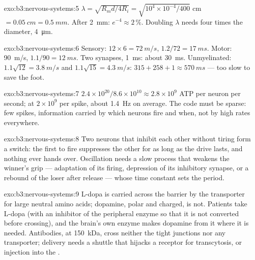 \begin{solution}{exo:b3:nervous-systems:5}
$\lambda = \sqrt{R_{m}d/4R_{i}} = \sqrt{10^{4}\times 10^{-4}/400}$ cm
$= \qty{0.05}{cm} = \qty{0.5}{mm}$. After \qty{2}{mm}: $e^{-4} \approx
2\,\%$. Doubling $\lambda$ needs four times the diameter,
\qty{4}{\micro m}.
\end{solution}

\begin{solution}{exo:b3:nervous-systems:6}
Sensory: $12\times 6 = \qty{72}{m/s}$, $1.2/72 = \qty{17}{ms}$. Motor:
\qty{90}{m/s}, $1.1/90 = \qty{12}{ms}$. Two synapses, \qty{1}{ms}: about
\qty{30}{ms}. Unmyelinated: $1.1\sqrt{12} = \qty{3.8}{m/s}$ and
$1.1\sqrt{15} = \qty{4.3}{m/s}$: $315 + 258 + 1 \approx \qty{570}{ms}$
--- too slow to save the foot.
\end{solution}

\begin{solution}{exo:b3:nervous-systems:7}
$2.4\times 10^{20}/8.6\times 10^{10} \approx 2.8\times 10^{9}$ ATP per
neuron per second; at $2\times 10^{9}$ per spike, about \qty{1.4}{Hz}
on average. The code must be sparse: few spikes, information carried by
which neurons fire and when, not by high rates everywhere.
\end{solution}

\begin{solution}{exo:b3:nervous-systems:8}
Two neurons that inhibit each other without tiring form a switch: the
first to fire suppresses the other for as long as the drive lasts, and
nothing ever hands over. Oscillation needs a slow process that weakens
the winner's grip --- adaptation of its firing, depression of its
inhibitory synapse, or a rebound of the loser after release --- whose
time constant sets the period.
\end{solution}

\begin{solution}{exo:b3:nervous-systems:9}
L-dopa is carried across the barrier by the transporter for large
neutral amino acids; dopamine, polar and charged, is not. Patients take
L-dopa (with an inhibitor of the peripheral enzyme so that it is not
converted before crossing), and the brain's own enzyme makes dopamine
from it where it is needed. Antibodies, at \qty{150}{kDa}, cross
neither the tight junctions nor any transporter; delivery needs a
shuttle that hijacks a receptor for transcytosis, or injection into the
.
\end{solution}

